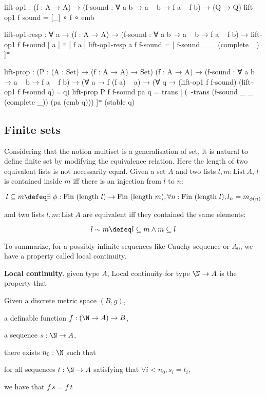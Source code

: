 


  lift-op1 : (f : A → A) → (f-sound : ∀ a b → a ~ b → f a ~ f b) → (Q → Q)
  lift-op1 f sound = [_] ∘ f ∘ emb


  lift-op1-resp : ∀ a → (f : A → A) → (f-sound : ∀ a b → a ~ b → f a ~ f b) 
                → lift-op1 f f-sound [ a ] ≡ [ f a ]
  lift-op1-resp a f f-sound = [ f-sound _ _ (complete _) ]⁼

  lift-prop : (P : (A : Set) → (f : A → A) → Set)
              (f : A → A) →
              (f-sound : ∀ a b → a ~ b → f a ~ f b) →
              (∀ a → f (f a) ~ a) → (∀ q → (lift-op1 f f-sound) (lift-op1 f f-sound q) ≡ q)
  lift-prop P f f-sound pa q = trans [ (~-trans (f-sound _ _ (complete _)) (pa (emb q))) ]⁼ (stable q)




\subsection{Finite sets}

Considering that the notion multiset is a generalisation of set, it is natural to define finite set by modifying the equivalence relation. Here the length of two equivalent lists is not necessarily equal.
Given a set $A$ and two lists $l,m : \text{List}~ A$, $l$ is contained inside $m$ iff there is an injection from $l$ to $n$:


$$l \subseteq m \defeq \exists ~\phi : \text{Fin}~(\text{length} ~ l) \to \text{Fin}~ (\text{length} ~ m), \forall n : \text{Fin}~(\text{length} ~ l), l_n = m_{\phi (n)}$$

and two lists $l,m : \text{List}~ A$ are equivalent iff they contained the same elements:

$$l \sim m \defeq l \subseteq m \wedge m \subseteq l$$








To summarize, for a possibly infinite sequences like Cauchy sequence or $A_0$, we have a property called local continuity.

\begin{definition}
\textbf{Local continuity}. given type $A$, Local continuity for type $\N \to A$ is the property that 

Given a discrete metric space $(B, g)$,

a definable function $f : (\N \to A) \to B$,

a sequence $s : \N \to A$,

there exists $n_0 : \N$ such that

for all sequences $t : \N \to A$ satisfying that $\forall i < n_0, s_i = t_i$,

we have that $f~s = f~t$

\end{definition}

